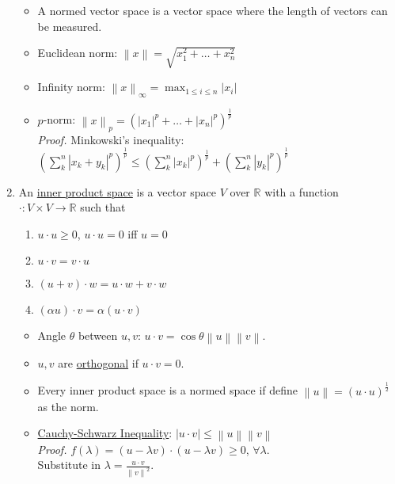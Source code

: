 \documentclass[%
 aip,
 jmp,%
 amsmath,amssymb,
 reprint,%
]{revtex4-1}
\def\R{{\mathbb R}}
\def\a{\alpha}
\def\l{\lambda}
\renewenvironment{proof}{\color{gray}\footnotesize\emph{Proof.}}{}
\newcommand{\norm}[1]{\left\lVert#1\right\rVert}
\newcommand{\defn}[1]{\underline{#1}}
\begin{document}
\begin{enumerate}
      \begin{itemize}
        \item {\footnotesize A normed vector space is a vector space where the
        length of vectors can be measured. }
        \item Euclidean norm: $\norm{x} = \sqrt{x_1^2+\dots+x_n^2}$
        \item Infinity norm: $\norm{x}_{\infty} = \max_{1\le i\le n} |x_i|$
        \item $p$-norm: $\norm{x}_{p} = \left(|x_1|^p+\dots+|x_n|^p\right)^{\frac{1}{p}}$\\
            \begin{proof}
              Minkowski's inequality:\\
              $ \left(\sum_{k}^{n}|x_k+y_k|^p\right)^{\frac{1}{p}} \le
                   \left(\sum_{k}^{n}|x_k|^p\right)^{\frac{1}{p}} +
                   \left(\sum_{k}^{n}|y_k|^p\right)^{\frac{1}{p}}
              $
            \end{proof}
      \end{itemize}

    \item An \defn{inner product space} is a vector space $V$ over $\R$ with a
    function $\boldsymbol{\cdot}: V \times V \to \R$ such that
        \begin{enumerate}
          \item $u \cdot u \ge 0$, $u \cdot u = 0$ iff $u=0$
          \item $u \cdot v = v \cdot u$
          \item $(u+v)\cdot w = u \cdot w + v \cdot w$
          \item $(\a u)\cdot v = \a (u\cdot v)$
        \end{enumerate}
        \begin{itemize}
          \item Angle $\theta$ between $u,v$: $u \cdot v=\cos\theta \norm{u}\norm{v}$.
          \item $u,v$ are \defn{orthogonal} if $u \cdot v=0$.
          \item Every inner product space is a normed space if define
          $\norm{u} = (u\cdot u)^{\frac{1}{2}}$ as the norm.
          \item \defn{Cauchy-Schwarz Inequality}: $|u\cdot v| \le \norm{u}\norm{v}$\\
              \begin{proof}
                $f(\l)=(u-\l v)\cdot (u-\l v) \ge 0$, $\forall\l$.\\
                Substitute in $\l=\frac{u\cdot v}{\norm{v}^2}$.
              \end{proof}
        \end{itemize}
\end{enumerate}
\end{document}
